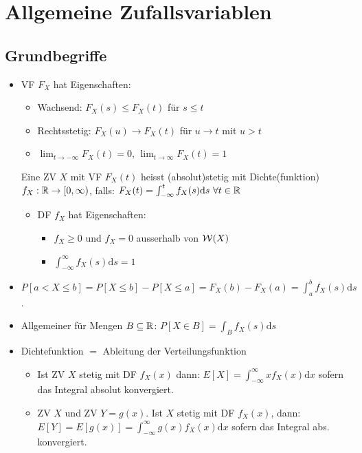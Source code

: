 
\section{Allgemeine Zufallsvariablen}
\subsection{Grundbegriffe}
\begin{itemize}
    \item VF $F_X$ hat Eigenschaften:
        \begin{itemize}
            \item Wachsend: $F_X(s) \le F_X(t)$ für $s \le t$
            \item Rechtsstetig: $F_X(u) \to F_X(t)$ für $u \to t$ mit $u > t$
            \item $\lim_{t \to -\infty} F_X(t) = 0$, $\lim_{t \to \infty} F_X(t) = 1$
        \end{itemize}
     Eine ZV $X$ mit VF $F_X(t)$ heisst (absolut)stetig mit Dichte(funktion) $f_X: \mathbb{R} \to [0, \infty)$, falls: $F_X(t) = \int_{-\infty}^{t} f_X(s) \mathrm{d}s \ \forall t \in \R$
        \begin{itemize}
            \item DF $f_X$ hat Eigenschaften:
                \begin{itemize}
                    \item $f_X \ge 0$ und $f_X = 0$ ausserhalb von $\mathcal{W}(X)$
                    \item $\int_{-\infty}^{\infty} f_X(s) \mathrm{d}s = 1$
                \end{itemize}
        \end{itemize}
    \item $P[a < X \le b] = P[X \le b] - P[X \le a] = F_X(b) - F_X(a) = \int_{a}^{b} f_X(s) \mathrm{d}s$.
    \item Allgemeiner für Mengen $B \subseteq \mathbb{R}$:  $P[X \in B] = \int_{B} f_X(s) \mathrm{d}s$
    \item Dichtefunktion $=$ Ableitung der Verteilungsfunktion
        \begin{itemize}
            \item Ist ZV $X$ stetig mit DF $f_X(x)$ dann: $E[X] = \int_{-\infty}^{\infty} x f_X(x) \mathrm{d}x$ sofern das Integral absolut konvergiert.
            \item ZV $X$ und ZV $Y = g(x)$. Ist $X$ stetig mit DF $f_X(x)$, dann: $E[Y] = E[g(x)] = \int_{-\infty}^{\infty}  g(x) f_X(x) \mathrm{d}x$ sofern das Integral abs. konvergiert.

\end{itemize}
\end{itemize}
